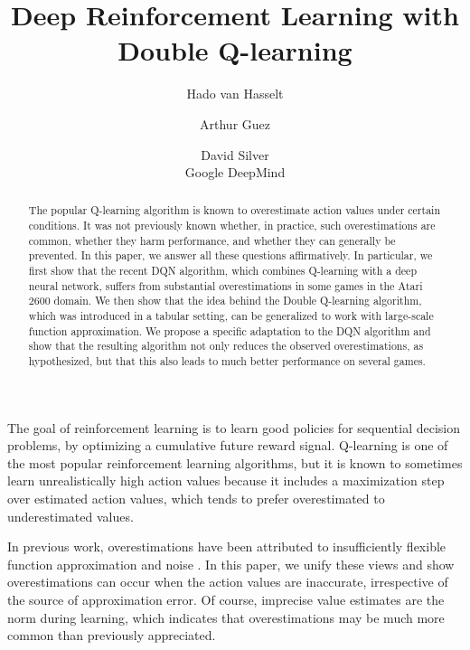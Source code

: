 \documentclass[letterpaper]{article}
\begin{document}
\title{Deep Reinforcement Learning with Double Q-learning}

\author{Hado van Hasselt \and
Arthur Guez \and
David Silver \\
Google DeepMind}





\maketitle
\begin{abstract}
The popular Q-learning algorithm is known to overestimate action values under certain conditions. It was not previously known whether, in practice, such overestimations are common, whether they harm performance, and whether they can generally be prevented.  In this paper, we answer all these questions affirmatively.  In particular, we first show that the recent DQN algorithm, which combines Q-learning with a deep neural network, suffers from substantial overestimations in some games in the Atari 2600 domain.  We then show that the idea behind the Double Q-learning algorithm, which was introduced in a tabular setting, can be generalized to work with large-scale function approximation.  We propose a specific adaptation to the DQN algorithm and show that the resulting algorithm not only reduces the observed overestimations, as hypothesized, but that this also leads to much better performance on several games.
\end{abstract}



\noindent The goal of reinforcement learning \citep{SuttonBarto:1998} is to learn good policies for sequential decision problems, by optimizing a cumulative future reward signal.
Q-learning \citep{Watkins:1989} is one of the most popular reinforcement learning algorithms, but it is known to sometimes learn unrealistically high action values because it includes a maximization step over estimated action values, which tends to prefer overestimated to underestimated values.

In previous work, overestimations have been attributed to insufficiently flexible function approximation \citep{Thrun:1993} and noise \citep{vanHasselt:2010,vanHasselt:2011}.  In this paper, we unify these views and show overestimations can occur when the action values are inaccurate, irrespective of the source of approximation error.  Of course, imprecise value estimates are the norm during learning, which indicates that overestimations may be much more common than previously appreciated.
\end{document}
